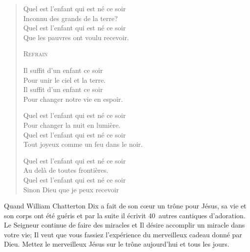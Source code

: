 \begin{dvquotes}
\ornrule
\begin{verse}
\begin{altverse}
 Quel est l'enfant qui est né ce soir\\
Inconnu des grands de la terre?\\
Quel est l'enfant qui est né ce soir\\
Que les pauvres ont voulu recevoir.
\end{altverse}

\textsc{Refrain\frcolon{}}\\
\begin{altverse}
Il suffit d'un enfant ce soir\\
Pour unir le ciel et la terre.\\
Il suffit d'un enfant ce soir\\
Pour changer notre vie en espoir.
\end{altverse}

\begin{altverse}
 Quel est l'enfant qui est né ce soir\\
Pour changer la nuit en lumière.\\
Quel est l'enfant qui est né ce soir\\
Tout joyeux comme un feu dans le noir.
\end{altverse}

\begin{altverse}
 Quel est l'enfant qui est né ce soir\\
Au delà de toutes frontières.\\
Quel est l'enfant qui est né ce soir\\
Sinon Dieu que je peux recevoir
\end{altverse}
\end{verse}
\ornrule
\end{dvquotes}

Quand William Chatterton Dix a fait de son cœur un trône pour Jésus, sa vie et son corps ont été guéris et par la suite il écrivit 40~autres cantiques d'adoration. Le Seigneur continue de faire des miracles et Il désire accomplir un miracle dans votre vie; Il veut que vous fassiez l'expérience du merveilleux cadeau donné par Dieu. Mettez le merveilleux Jésus sur le trône aujourd'hui et tous les jours.

